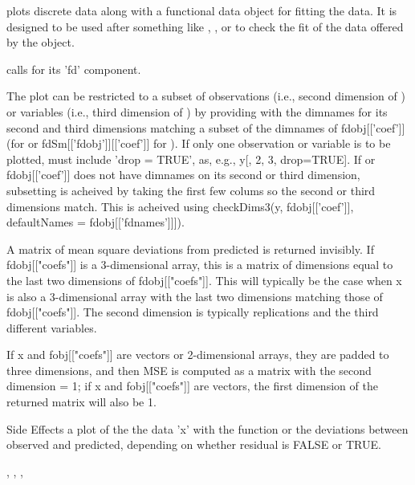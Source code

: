 \documentclass{article}
\begin{document}
\begin{Details}\relax
{} plots discrete data along with a functional data object
for fitting the data.  It is designed to be used after something like
, ,  or
 to check the fit of the data offered by the
 object.

 calls  for its 'fd' component.

The plot can be restricted to a subset of observations (i.e., second
dimension of ) or variables (i.e., third dimension of
) by providing  with the dimnames for its second and
third dimensions matching a subset of the dimnames of fdobj[['coef']]
(for  or fdSm[['fdobj']][['coef']] for
).  If only one observation or variable is to
be plotted,  must include 'drop = TRUE', as, e.g., y[, 2, 3,
drop=TRUE].  If  or fdobj[['coef']] does not have dimnames on
its second or third dimension, subsetting is acheived by taking the
first few colums so the second or third dimensions match.  This is
acheived using checkDims3(y, fdobj[['coef']], defaultNames =
fdobj[['fdnames']]]).
\end{Details}
\begin{Value}
A matrix of mean square deviations from predicted is returned
invisibly.  If fdobj[["coefs"]] is a 3-dimensional array, this is a
matrix of dimensions equal to the last two dimensions of
fdobj[["coefs"]].  This will typically be the case when x is also a
3-dimensional array with the last two dimensions matching those of
fdobj[["coefs"]].  The second dimension is typically replications and
the third different variables.

If x and fobj[["coefs"]] are vectors or 2-dimensional arrays, they are
padded to three dimensions, and then MSE is computed as a matrix with
the second dimension = 1;  if x and fobj[["coefs"]] are vectors, the
first dimension of the returned matrix will also be 1.
\end{Value}
\begin{Section}{Side Effects}
a plot of the the data 'x' with the function or the deviations between
observed and predicted, depending on whether residual is FALSE or
TRUE.
\end{Section}
\begin{SeeAlso}\relax
{}, 
, 
, 
\end{SeeAlso}
\end{document}

